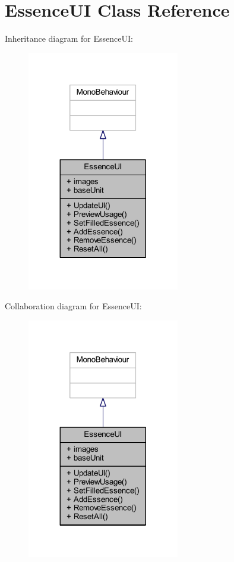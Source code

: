 \hypertarget{class_essence_u_i}{}\section{Essence\+UI Class Reference}
\label{class_essence_u_i}


Inheritance diagram for Essence\+UI\+:
\nopagebreak
\begin{figure}[H]
\begin{center}
\leavevmode
\includegraphics[width=188pt]{class_essence_u_i__inherit__graph}
\end{center}
\end{figure}


Collaboration diagram for Essence\+UI\+:
\nopagebreak
\begin{figure}[H]
\begin{center}
\leavevmode
\includegraphics[width=188pt]{class_essence_u_i__coll__graph}
\end{center}
\end{figure}
